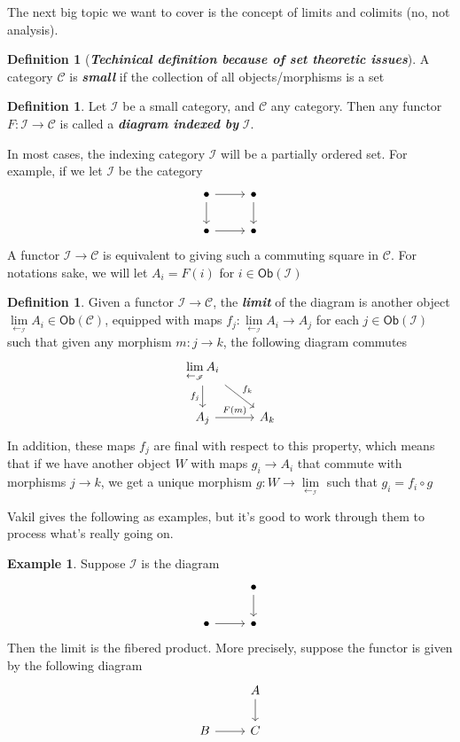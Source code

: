 \documentclass[psamsfonts]{amsart}
\theoremstyle{definition}
\newtheorem{defn}[thm]{Definition}
\newtheorem{exmp}[thm]{Example}
\theoremstyle{remark}
\newcommand{\ib}[1]{\textbf{\textit{#1}}}
\begin{document}
The next big topic we want to cover is the concept of limits and colimits (no, not analysis).
%
\begin{defn}[\ib{Techinical definition because of set theoretic issues}]
A category $\mathscr{C}$ is \ib{small} if the collection of all objects/morphisms is a set
\end{defn}
%
\begin{defn}
Let $\mathscr{I}$ be a small category, and $\mathscr{C}$ any category. Then any functor $F : \mathscr{I} \to \mathscr{C}$ is called a \ib{diagram indexed by} $\mathscr{I}$.
\end{defn}
In most cases, the indexing category $\mathscr{I}$ will be a partially ordered set. For example, if we let $\mathscr{I}$ be the category
$$\begin{tikzcd}
  \bullet \arrow[r] \arrow[d] & \bullet \arrow[d] \\
  \bullet \arrow[r] & \bullet
  \end{tikzcd}
$$
A functor $\mathscr{I} \to \mathscr{C}$ is equivalent to giving such a commuting square in $\mathscr{C}$. For notations sake, we will let $A_i = F(i)$ for $i \in \mathsf{Ob}(\mathscr{I})$
%
\begin{defn}
Given a functor $\mathscr{I} \to \mathscr{C}$, the \ib{limit} of the diagram is another object $\lim\limits_{\leftarrow_\mathscr{I}} A_i \in \mathsf{Ob}(\mathscr{C})$, equipped with maps $f_j : \lim\limits_{\leftarrow_{\mathscr{I}}} A_i \to A_j$ for each $j \in \mathsf{Ob}(\mathscr{I})$ such that given any morphism $m: j \to k$, the following diagram commutes
$$\begin{tikzcd}
\lim\limits_{\leftarrow_{\mathscr{I}}}A_i \arrow[d,"f_j"'] \arrow[dr, "f_k"] \\
A_j \arrow[r, "F(m)"]  & A_k
\end{tikzcd}$$
In addition, these maps $f_j$ are final with respect to this property, which means that if we have another object $W$ with maps $g_i \to A_i$ that commute with morphisms $j \to k$, we get a unique morphism $g: W \to \lim\limits_{\leftarrow_{\mathscr{I}}}$ such that $g_i = f_i \circ g$
\end{defn}
%
Vakil gives the following as examples, but it's good to work through them to process what's really going on.
%
\begin{exmp}
Suppose $\mathscr{I}$ is the diagram 
$$\begin{tikzcd}
& \bullet \arrow[d] \\
\bullet \arrow[r] & \bullet
\end{tikzcd}$$
Then the limit is the fibered product. More precisely, suppose the functor is given by the following diagram
$$\begin{tikzcd}
& A \arrow[d]\\
B \arrow[r] & C
\end{tikzcd}$$
\end{exmp}
\end{document}
